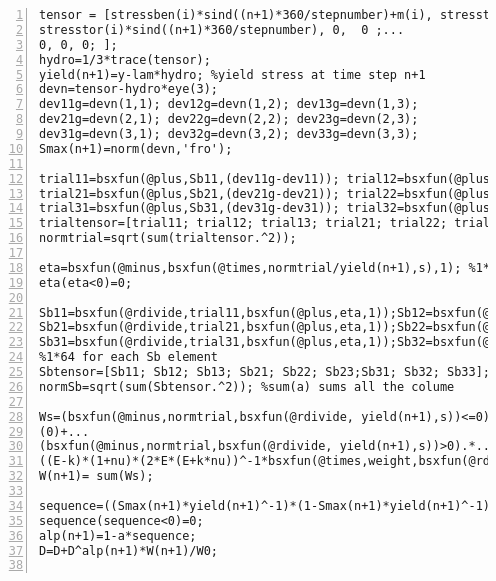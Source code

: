 \begin{lstlisting}[numbers=left, numberstyle=\tiny, keywordstyle=\color{blue!100}, commentstyle=\color{red!30!green!100!blue!100}, frame=shadowbox, rulesepcolor=\color{red!20!green!20!blue!20}]
tensor = [stressben(i)*sind((n+1)*360/stepnumber)+m(i), stresstor(i)*sind((n+1)*360/stepnumber), 0 ;...
stresstor(i)*sind((n+1)*360/stepnumber), 0,  0 ;...
0, 0, 0; ];
hydro=1/3*trace(tensor);
yield(n+1)=y-lam*hydro; %yield stress at time step n+1
devn=tensor-hydro*eye(3);
dev11g=devn(1,1); dev12g=devn(1,2); dev13g=devn(1,3);
dev21g=devn(2,1); dev22g=devn(2,2); dev23g=devn(2,3);
dev31g=devn(3,1); dev32g=devn(3,2); dev33g=devn(3,3);
Smax(n+1)=norm(devn,'fro');

trial11=bsxfun(@plus,Sb11,(dev11g-dev11)); trial12=bsxfun(@plus,Sb12,(dev12g-dev12));trial13=bsxfun(@plus,Sb13,(dev13g-dev13));
trial21=bsxfun(@plus,Sb21,(dev21g-dev21)); trial22=bsxfun(@plus,Sb22,(dev22g-dev22));trial23=bsxfun(@plus,Sb23,(dev23g-dev23));
trial31=bsxfun(@plus,Sb31,(dev31g-dev31)); trial32=bsxfun(@plus,Sb32,(dev32g-dev32));trial33=bsxfun(@plus,Sb33,(dev33g-dev33));
trialtensor=[trial11; trial12; trial13; trial21; trial22; trial23;trial31; trial32; trial33];
normtrial=sqrt(sum(trialtensor.^2));

eta=bsxfun(@minus,bsxfun(@times,normtrial/yield(n+1),s),1); %1*64
eta(eta<0)=0;

Sb11=bsxfun(@rdivide,trial11,bsxfun(@plus,eta,1));Sb12=bsxfun(@rdivide,trial12,bsxfun(@plus,eta,1));Sb13=bsxfun(@rdivide,trial13,bsxfun(@plus,eta,1));
Sb21=bsxfun(@rdivide,trial21,bsxfun(@plus,eta,1));Sb22=bsxfun(@rdivide,trial22,bsxfun(@plus,eta,1));Sb23=bsxfun(@rdivide,trial23,bsxfun(@plus,eta,1));
Sb31=bsxfun(@rdivide,trial31,bsxfun(@plus,eta,1));Sb32=bsxfun(@rdivide,trial32,bsxfun(@plus,eta,1));Sb33=bsxfun(@rdivide,trial33,bsxfun(@plus,eta,1));
%1*64 for each Sb element
Sbtensor=[Sb11; Sb12; Sb13; Sb21; Sb22; Sb23;Sb31; Sb32; Sb33];
normSb=sqrt(sum(Sbtensor.^2)); %sum(a) sums all the colume

Ws=(bsxfun(@minus,normtrial,bsxfun(@rdivide, yield(n+1),s))<=0).*...
(0)+...
(bsxfun(@minus,normtrial,bsxfun(@rdivide, yield(n+1),s))>0).*...
((E-k)*(1+nu)*(2*E*(E+k*nu))^-1*bsxfun(@times,weight,bsxfun(@rdivide,bsxfun(@times,bsxfun(@minus,normtrial,bsxfun(@rdivide, yield(n+1),s)),yield(n+1)),s)));
W(n+1)= sum(Ws);

sequence=((Smax(n+1)*yield(n+1)^-1)*(1-Smax(n+1)*yield(n+1)^-1)^-1)^b;
sequence(sequence<0)=0;
alp(n+1)=1-a*sequence;
D=D+D^alp(n+1)*W(n+1)/W0;


\end{lstlisting}
